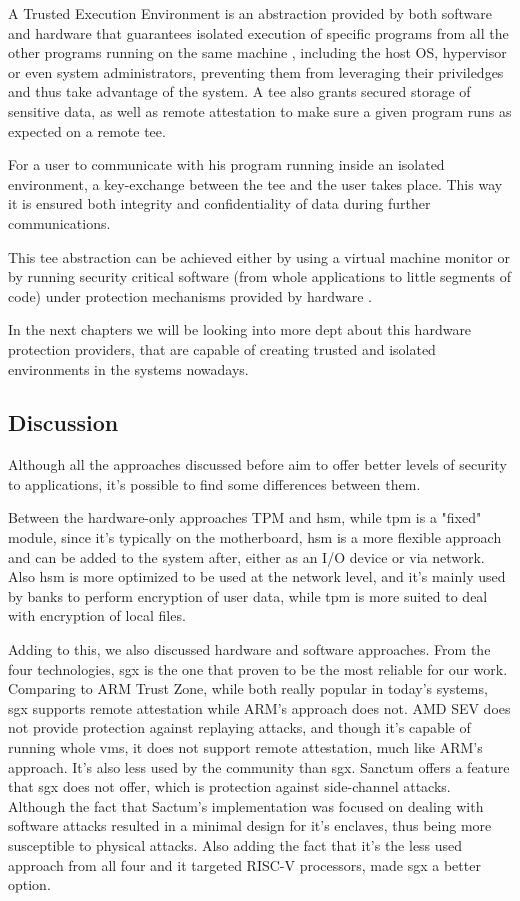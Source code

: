 A Trusted Execution Environment is an abstraction provided by both software and hardware that guarantees isolated execution of specific programs from all the other programs running on the same machine \cite{guiBorgesThesis}, including the host OS, hypervisor or even system administrators, preventing them from leveraging their priviledges and thus take advantage of the system. A \gls{tee} also grants secured storage of sensitive data, as well as remote attestation to make sure a given program runs as expected on a remote \gls{tee}. 

For a user to communicate with his program running inside an isolated environment, a key-exchange between the \gls{tee} and the user takes place. This way it is ensured both integrity and confidentiality of data during further communications.

This \gls{tee} abstraction can be achieved either by using a virtual machine monitor or by running security critical software (from whole applications to little segments of code) under protection mechanisms provided by hardware \cite{pcopThesis}. 

In the next chapters we will be looking into more dept about this hardware protection providers, that are capable of creating trusted and isolated environments in the systems nowadays.




\subsection{Discussion}
\label{ssec:tee_discussion}

Although all the approaches discussed before aim to offer better levels of security to applications, it's possible to find some differences between them. 

Between the hardware-only approaches TPM and \gls{hsm}, while \gls{tpm} is a "fixed" module, since it's typically on the motherboard, \gls{hsm} is a more flexible approach and can be added to the system after, either as an I/O device or via network. Also \gls{hsm} is more optimized to be used at the network level, and it's mainly used by banks to perform encryption of user data, while \gls{tpm} is more suited to deal with encryption of local files.

Adding to this, we also discussed hardware and software approaches. 
From the four technologies, \gls{sgx} is the one that proven to be the most reliable for our work. Comparing to ARM Trust Zone, while both really popular in today's systems, \gls{sgx} supports remote attestation while ARM's approach does not. AMD SEV does not provide protection against replaying attacks, and though it's capable of running whole \gls{vm}s, it does not support remote attestation, much like ARM's approach. It's also less used by the community than \gls{sgx}. Sanctum offers a feature that \gls{sgx} does not offer, which is protection against side-channel attacks. Although the fact that Sactum's implementation was focused on dealing with software attacks resulted in a minimal design for it's enclaves, thus being more susceptible to physical attacks. Also adding the fact that it's the less used approach from all four and it targeted RISC-V processors, made \gls{sgx} a better option.

